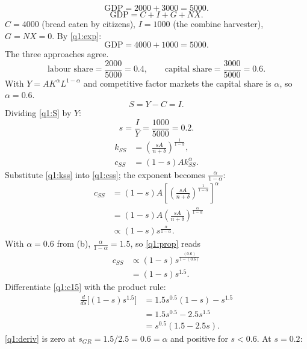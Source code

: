 \begin{sol}
\[
\text{GDP}=2000+3000=5000 .
\]
\begin{equation}
\text{GDP}=C+I+G+NX. \label{q1:exp}
\end{equation}
$C=4000$ (bread eaten by citizens), $I=1000$ (the combine harvester), $G=NX=0$. By \eqref{q1:exp}:
\[
\text{GDP}=4000+1000=5000 .
\]
The three approaches agree.
\[
\text{labour share}=\frac{2000}{5000}=0.4,\qquad \text{capital share}=\frac{3000}{5000}=0.6 .
\]
With $Y=AK^\alpha L^{1-\alpha}$ and competitive factor markets the capital share is $\alpha$, so $\alpha=0.6$.
\begin{equation}
S=Y-C=I. \label{q1:S}
\end{equation}
Dividing \eqref{q1:S} by $Y$:
\[
s=\frac{I}{Y}=\frac{1000}{5000}=0.2 .
\]
\begin{align}
k_{SS} &= \left(\frac{sA}{n+\delta}\right)^{\frac1{1-\alpha}}, \label{q1:kss}\\
c_{SS} &= (1-s)Ak_{SS}^\alpha. \label{q1:css}
\end{align}
Substitute \eqref{q1:kss} into \eqref{q1:css}; the exponent becomes $\frac{\alpha}{1-\alpha}$:
\begin{align}
c_{SS} &= (1-s)A\left[\left(\frac{sA}{n+\delta}\right)^{\frac1{1-\alpha}}\right]^{\alpha}\nonumber\\
&= (1-s)A\left(\frac{sA}{n+\delta}\right)^{\frac{\alpha}{1-\alpha}}\nonumber\\
&\propto (1-s)s^{\frac{\alpha}{1-\alpha}}. \label{q1:prop}
\end{align}
With $\alpha=0.6$ from (b), $\frac{\alpha}{1-\alpha}=1.5$, so \eqref{q1:prop} reads
\begin{align}
c_{SS} &\propto (1-s)s^{\frac{(0.6)}{1-(0.6)}}\nonumber\\
&= (1-s)s^{1.5}. \label{q1:c15}
\end{align}
Differentiate \eqref{q1:c15} with the product rule:
\begin{align}
\frac{d}{ds}\big[(1-s)s^{1.5}\big] &= 1.5s^{0.5}(1-s)-s^{1.5}\nonumber\\
&= 1.5s^{0.5}-2.5s^{1.5}\nonumber\\
&= s^{0.5}(1.5-2.5s). \label{q1:deriv}
\end{align}
\eqref{q1:deriv} is zero at $s_{GR}=1.5/2.5=0.6=\alpha$ and positive for $s<0.6$. At $s=0.2$:

\end{sol}
